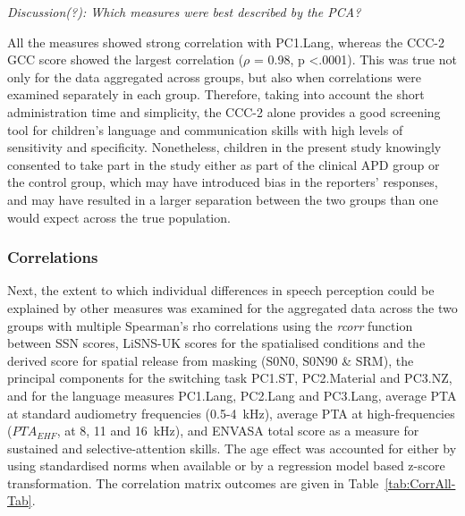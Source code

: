 \documentclass[a4paper, twoside]{templates/ociamthesis}
\begin{document}
\begin{correction}
\emph{Discussion(?): Which measures were best described by the PCA?}

All the measures showed strong correlation with PC1.Lang, whereas the
CCC-2 GCC score showed the largest correlation (\(\rho\) = 0.98, p
\textless.0001). This was true not only for the data aggregated across
groups, but also when correlations were examined separately in each
group. Therefore, taking into account the short administration time and
simplicity, the CCC-2 alone provides a good screening tool for
children's language and communication skills with high levels of
sensitivity and specificity. Nonetheless, children in the present study
knowingly consented to take part in the study either as part of the
clinical APD group or the control group, which may have introduced bias
in the reporters' responses, and may have resulted in a larger
separation between the two groups than one would expect across the true
population.
\end{correction}

\hypertarget{correlations}{%
\subsubsection{Correlations}\label{correlations}}

Next, the extent to which individual differences in speech perception could be explained by other measures was examined for the aggregated data across the two groups with multiple Spearman's rho correlations using the \emph{rcorr} function \autocite[Hmisc R package;][]{HmiscPackageR} between SSN scores, LiSNS-UK scores for the spatialised conditions and the derived score for spatial release from masking (S0N0, S0N90 \& SRM), the principal components for the switching task PC1.ST, PC2.Material and PC3.NZ, and for the language measures PC1.Lang, PC2.Lang and PC3.Lang, average PTA at standard audiometry frequencies (0.5-4~kHz), average PTA at high-frequencies (\(PTA_{EHF}\), at 8, 11 and 16~kHz), and ENVASA total score as a measure for sustained and selective-attention skills. The age effect was accounted for either by using standardised norms when available or by a regression model based z-score transformation. The correlation matrix outcomes are given in Table~\ref{tab:CorrAll-Tab}.\\
\end{document}

